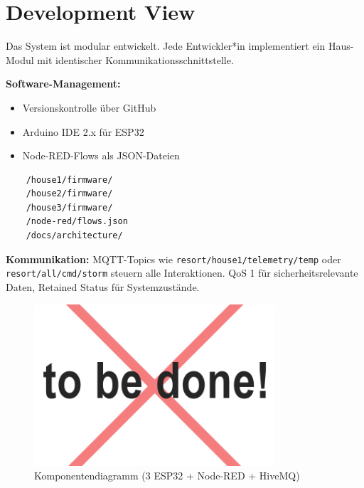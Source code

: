 \section{Development View}
Das System ist modular entwickelt.
Jede Entwickler*in implementiert ein Haus-Modul mit identischer Kommunikationsschnittstelle.

\textbf{Software-Management:}
\begin{itemize}[noitemsep]
	\item Versionskontrolle über GitHub
	\item Arduino IDE 2.x für ESP32
	\item Node-RED-Flows als JSON-Dateien
\end{itemize}

\begin{verbatim}
	/house1/firmware/
	/house2/firmware/
	/house3/firmware/
	/node-red/flows.json
	/docs/architecture/
\end{verbatim}

\textbf{Kommunikation:}
MQTT-Topics wie \texttt{resort/house1/telemetry/temp} oder
\texttt{resort/all/cmd/storm} steuern alle Interaktionen.
QoS 1 für sicherheitsrelevante Daten, Retained Status für Systemzustände.
\begin{figure}[h!]
	\centering
	\includegraphics[width=0.8\textwidth]{img/tbd.jpg}
	\caption{Komponentendiagramm (3 ESP32 + Node-RED + HiveMQ)}
	\label{fig:systemuebersicht}
\end{figure}
